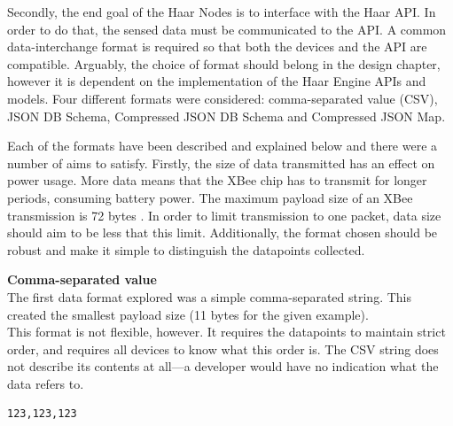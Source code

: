       Secondly, the end goal of the Haar Nodes is to interface with the Haar API. In order to do that, the sensed data must be communicated to the API. A common data-interchange format is required so that both the devices and the API are compatible. Arguably, the choice of format should belong in the design chapter, however it is dependent on the implementation of the Haar Engine APIs and models. Four different formats were considered: comma-separated value (CSV), JSON DB Schema, Compressed JSON DB Schema and Compressed JSON Map.

      Each of the formats have been described and explained below and there were a number of aims to satisfy. Firstly, the size of data transmitted has an effect on power usage. More data means that the XBee chip has to transmit for longer periods, consuming battery power. The maximum payload size of an XBee transmission is 72 bytes \citep{xbee-packet-size}. In order to limit transmission to one packet, data size should aim to be less that this limit. Additionally, the format chosen should be robust and make it simple to distinguish the datapoints collected.\\

      \noindent
      \begin{minipage}[t]{0.45\textwidth}
        \textbf{Comma-separated value}\\
        The first data format explored was a simple comma-separated string. This created the smallest payload size (11 bytes for the given example).\\

        This format is not flexible, however. It requires the datapoints to maintain strict order, and requires all devices to know what this order is. The CSV string does not describe its contents at all---a developer would have no indication what the data refers to.\\
      \end{minipage}
      \hfill
      \begin{minipage}[t]{0.45\textwidth}
        \begin{lstlisting}[frame=single, upquote=true]
  123,123,123
        \end{lstlisting}
      \end{minipage}

